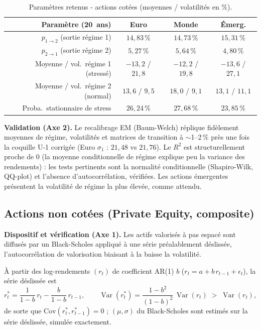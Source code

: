 \documentclass[11pt,a4paper]{article}
\renewcommand{\arraystretch}{1.4}
\newcommand{\tablehead}[1]{\textcolor{nxnavy}{\sffamily\bfseries\small #1}}
\begin{document}
\begin{table}[H]
\centering\small
\renewcommand{\arraystretch}{1.4}\setlength{\tabcolsep}{6pt}
\begin{tabularx}{\linewidth}{R C C C}
\toprule
\tablehead{Paramètre (20~ans)} & \tablehead{Euro} & \tablehead{Monde} & \tablehead{Émerg.} \\
\midrule
{} $p_{1\to2}$ (sortie régime 1) & $14{,}83\,\%$ & $14{,}73\,\%$ & $15{,}31\,\%$ \\
$p_{2\to1}$ (sortie régime 2) & $5{,}27\,\%$ & $5{,}64\,\%$ & $4{,}80\,\%$ \\
 Moyenne / vol.\ régime 1 (stressé) & $-13{,}2$ / $21{,}8$ & $-12{,}2$ / $19{,}8$ & $-13{,}6$ / $27{,}1$ \\
Moyenne / vol.\ régime 2 (normal) & $13{,}6$ / $9{,}5$ & $18{,}0$ / $9{,}1$ & $13{,}1$ / $11{,}1$ \\
 Proba.\ stationnaire de stress & $26{,}24\,\%$ & $27{,}68\,\%$ & $23{,}85\,\%$ \\
\bottomrule
\end{tabularx}
\caption{Paramètres retenus - actions cotées (moyennes / volatilités en \%).}
\end{table}

\textbf{Validation (Axe 2).} Le recalibrage EM (Baum-Welch) réplique fidèlement moyennes de régime, volatilités et matrices de transition à $\sim$1--2\,\% près une fois la coquille U-1 corrigée (Euro $\sigma_1$ : $21{,}48$ vs $21{,}76$). Le $R^2$ est structurellement proche de $0$ (la moyenne conditionnelle de régime explique peu la variance des rendements) : les tests pertinents sont la normalité conditionnelle (Shapiro-Wilk, QQ-plot) et l'absence d'autocorrélation, vérifiées. Les actions émergentes présentent la volatilité de régime la plus élevée, comme attendu.

\subsection{Actions non cotées (Private Equity, composite)}

\textbf{Dispositif et vérification (Axe 1).} Les actifs valorisés à pas espacé sont diffusés par un Black-Scholes appliqué à une série préalablement déslissée, l'autocorrélation de valorisation biaisant à la baisse la volatilité.
\begin{definitionbox}
À partir des log-rendements $(r_t)$ de coefficient AR(1) $b$ ($r_t=a+b\,r_{t-1}+\epsilon_t$), la série déslissée est
\[
r_t^\ast=\frac{1}{1-b}\,r_t-\frac{b}{1-b}\,r_{t-1},\qquad
\operatorname{Var}(r_t^\ast)=\frac{1-b^2}{(1-b)^2}\,\operatorname{Var}(r_t)\;>\;\operatorname{Var}(r_t),
\]
de sorte que $\mathrm{Cov}(r_t^\ast,r_{t-1}^\ast)=0$ ; $(\mu,\sigma)$ du Black-Scholes sont estimés sur la série déslissée, simulée exactement.
\end{definitionbox}
\end{document}
